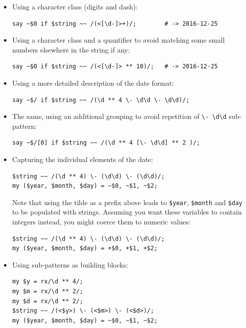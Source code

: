 \begin{itemize}

\item Using a character class (digits and dash):

\begin{verbatim}
say ~$0 if $string ~~ /(<[\d-]>+)/;        # -> 2016-12-25
\end{verbatim}
%

\item Using a character class and a quantifier to avoid 
matching some small numbers elsewhere in the string if any:

\begin{verbatim}
say ~$0 if $string ~~ /(<[\d-]> ** 10)/;   # -> 2016-12-25
\end{verbatim}
%

\item Using a more detailed description of the date format:
\begin{verbatim}
say ~$/ if $string ~~ /(\d ** 4 \- \d\d \- \d\d)/;
\end{verbatim}
%

\item The same, using an additional grouping to avoid 
repetition of \verb'\- \d\d' sub-pattern: 

\begin{verbatim}
say ~$/[0] if $string ~~ /(\d ** 4 [\- \d\d] ** 2 )/; 
\end{verbatim}
%

\item Capturing the individual elements of the date:
\begin{verbatim}
$string ~~ /(\d ** 4) \- (\d\d) \- (\d\d)/;
my ($year, $month, $day) = ~$0, ~$1, ~$2;
\end{verbatim}
%
Note that using the tilde as a prefix above leads to 
\verb'$year', \verb'$month' and \verb'$day' to be 
populated with strings. Assuming you want these variables 
to contain integers instead, you might coerce them 
to numeric values:
\begin{verbatim}
$string ~~ /(\d ** 4) \- (\d\d) \- (\d\d)/;
my ($year, $month, $day) = +$0, +$1, +$2;
\end{verbatim}
%
 

\item Using sub-patterns as building blocks:
\begin{verbatim}
my $y = rx/\d ** 4/;
my $m = rx/\d ** 2/;
my $d = rx/\d ** 2/;
$string ~~ /(<$y>) \- (<$m>) \- (<$d>)/;
my ($year, $month, $day) = ~$0, ~$1, ~$2;
\end{verbatim}
%


\end{itemize}
